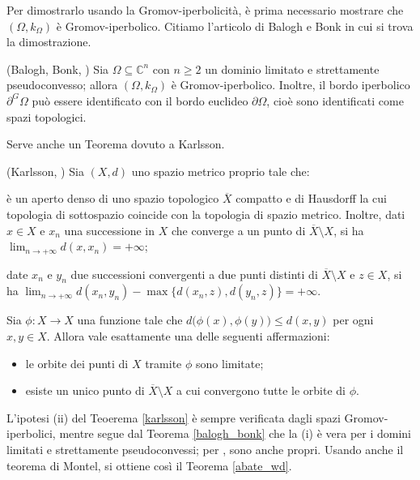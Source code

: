 Per dimostrarlo usando la Gromov-iperbolicità, è prima necessario mostrare che $(\Omega,k_{\Omega})$ è Gromov-iperbolico. Citiamo l'articolo di Balogh e Bonk in cui si trova la dimostrazione.

\begin{thm} \label{balogh_bonk}
    (Balogh, Bonk, \cite[Theorem 1.4]{BB}) Sia $\Omega \subseteq \mathbb{C}^n$ con $n \ge 2$ un dominio limitato e strettamente pseudoconvesso; allora $(\Omega,k_{\Omega})$ è Gromov-iperbolico. Inoltre, il bordo iperbolico $\partial^G\Omega$ può essere identificato con il bordo euclideo $\partial\Omega$, cioè sono identificati come spazi topologici.
\end{thm}

Serve anche un Teorema dovuto a Karlsson.

\begin{thm} \label{karlsson}
    (Karlsson, \cite[Corollary 3.7]{Ka}) Sia $(X,d)$ uno spazio metrico proprio tale che:
    \begin{nlist}
        \item è un aperto denso di uno spazio topologico $\overline{X}$ compatto e di Hausdorff la cui topologia di sottospazio coincide con la topologia di spazio metrico. Inoltre, dati $x \in X$ e $x_n$ una successione in $X$ che converge a un punto di $\overline{X}\setminus X$, si ha $\displaystyle\lim_{n\longrightarrow+\infty}d(x,x_n)=+\infty$;
        \item date $x_n$ e $y_n$ due successioni convergenti a due punti distinti di $\overline{X}\setminus X$ e $z \in X$, si ha $\displaystyle\lim_{n\longrightarrow+\infty} d(x_n,y_n)-\max\{d(x_n,z),d(y_n,z)\}=+\infty$.
    \end{nlist}
    Sia $\phi:X \longrightarrow X$ una funzione tale che $d\big(\phi(x),\phi(y)\big)\le d(x,y)$ per ogni $x,y\in X$. Allora vale esattamente una delle seguenti affermazioni:
    \begin{itemize}
        \item le orbite dei punti di $X$ tramite $\phi$ sono limitate;
        \item esiste un unico punto di $\overline{X}\setminus X$ a cui convergono tutte le orbite di $\phi$.
    \end{itemize}
\end{thm}

L'ipotesi (ii) del Teoerema \ref{karlsson} è sempre verificata dagli spazi Gromov-iperbolici, mentre segue dal Teorema \ref{balogh_bonk} che la (i) è vera per i domini limitati e strettamente pseudoconvessi; per \cite[Paragraph 3.3]{G}, sono anche propri. Usando anche il teorema di Montel, si ottiene così il Teorema \ref{abate_wd}.

